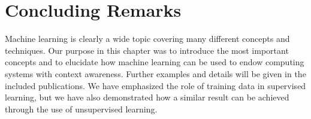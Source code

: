%

\section{Concluding Remarks}
\label{sec:ml_concluding_remarks}

Machine learning is clearly a wide topic covering many different concepts and techniques. Our purpose in this chapter was to introduce the most important concepts and to elucidate how machine learning can be used to endow computing systems with context awareness. Further examples and details will be given in the included publications. We have emphasized the role of training data in supervised learning, but we have also demonstrated how a similar result can be achieved through the use of unsupervised learning.

%
